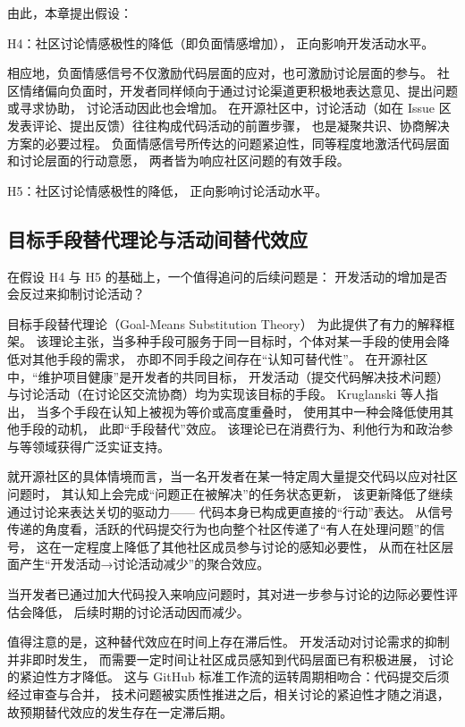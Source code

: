 由此，本章提出假设：

H4：社区讨论情感极性的降低（即负面情感增加），
正向影响开发活动水平。

相应地，负面情感信号不仅激励代码层面的应对，也可激励讨论层面的参与。
社区情绪偏向负面时，开发者同样倾向于通过讨论渠道更积极地表达意见、提出问题或寻求协助，
讨论活动因此也会增加。
在开源社区中，讨论活动（如在 Issue 区发表评论、提出反馈）往往构成代码活动的前置步骤，
也是凝聚共识、协商解决方案的必要过程\cite{guzzi2013}。
负面情感信号所传达的问题紧迫性，同等程度地激活代码层面和讨论层面的行动意愿，
两者皆为响应社区问题的有效手段。

H5：社区讨论情感极性的降低，
正向影响讨论活动水平。

\subsection{目标手段替代理论与活动间替代效应}

在假设 H4 与 H5 的基础上，一个值得追问的后续问题是：
开发活动的增加是否会反过来抑制讨论活动？

目标手段替代理论（Goal-Means Substitution Theory）\cite{kruglanski2002theory}
为此提供了有力的解释框架。
该理论主张，当多种手段可服务于同一目标时，个体对某一手段的使用会降低对其他手段的需求，
亦即不同手段之间存在“认知可替代性”。
在开源社区中，“维护项目健康”是开发者的共同目标，
开发活动（提交代码解决技术问题）与讨论活动（在讨论区交流协商）均为实现该目标的手段。
Kruglanski 等人\citeyear{kruglanski2002theory}指出，
当多个手段在认知上被视为等价或高度重叠时，
使用其中一种会降低使用其他手段的动机，
此即“手段替代”效应。
该理论已在消费行为、利他行为和政治参与等领域获得广泛实证支持。

就开源社区的具体情境而言，当一名开发者在某一特定周大量提交代码以应对社区问题时，
其认知上会完成“问题正在被解决”的任务状态更新，
该更新降低了继续通过讨论来表达关切的驱动力——
代码本身已构成更直接的“行动”表达。
从信号传递的角度看，活跃的代码提交行为也向整个社区传递了“有人在处理问题”的信号，
这在一定程度上降低了其他社区成员参与讨论的感知必要性，
从而在社区层面产生“开发活动→讨论活动减少”的聚合效应。

当开发者已通过加大代码投入来响应问题时，其对进一步参与讨论的边际必要性评估会降低，
后续时期的讨论活动因而减少。

值得注意的是，这种替代效应在时间上存在滞后性。
开发活动对讨论需求的抑制并非即时发生，
而需要一定时间让社区成员感知到代码层面已有积极进展，
讨论的紧迫性方才降低。
这与 GitHub 标准工作流的运转周期相吻合：代码提交后须经过审查与合并，
技术问题被实质性推进之后，相关讨论的紧迫性才随之消退，
故预期替代效应的发生存在一定滞后期。

